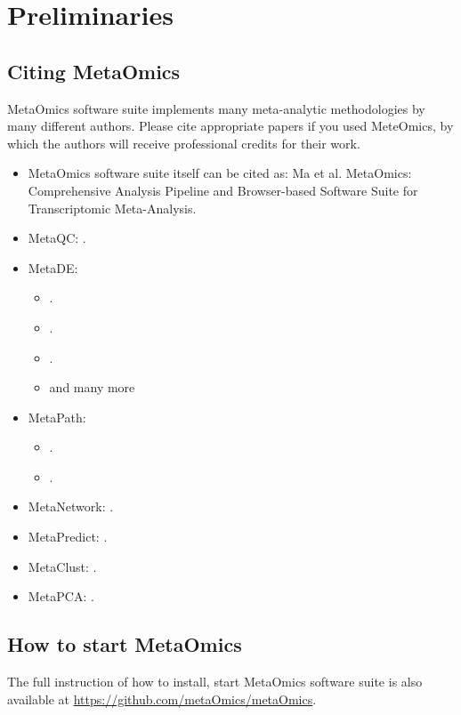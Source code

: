 \section{Preliminaries}
\subsection{Citing MetaOmics}
MetaOmics software suite implements many meta-analytic methodologies by many different authors. 
Please cite appropriate papers if you used MeteOmics,
by which the authors will receive professional credits for their work.

\begin{itemize}
\item MetaOmics software suite  itself can be cited as: Ma et al. MetaOmics: Comprehensive Analysis Pipeline and Browser-based Software Suite for Transcriptomic Meta-Analysis.
\item MetaQC: .
\item MetaDE: 
\begin{itemize}
\item {}.
\item {}.
\item {}.
\item and many more
\end{itemize}
\item MetaPath: 
\begin{itemize}
\item {}.
\item {}.
\end{itemize}
\item MetaNetwork: .
\item MetaPredict: .
\item MetaClust: .
\item MetaPCA: .
\end{itemize}



\subsection{How to start MetaOmics}

The full instruction of how to install, start MetaOmics software suite is also available at \url{https://github.com/metaOmics/metaOmics}.


